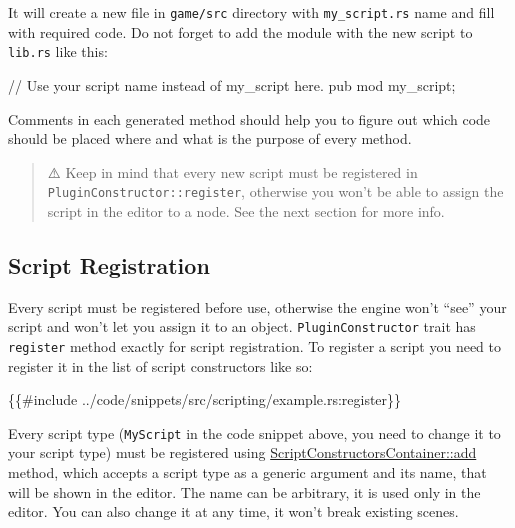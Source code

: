 \documentclass[
]{book}
\newenvironment{Shaded}{\begin{snugshade}}{\end{snugshade}}
\newcommand{\NormalTok}[1]{#1}
\theoremstyle{definition}
\theoremstyle{definition}
\theoremstyle{definition}
\theoremstyle{definition}
\theoremstyle{remark}
\begin{document}
It will create a new file in \texttt{game/src} directory with \texttt{my\_script.rs} name and fill with required code. Do not forget to add the module with the new script to \texttt{lib.rs} like this:

\begin{Shaded}
\begin{Highlighting}[]
\NormalTok{// Use your script name instead of \textasciigrave{}my\_script\textasciigrave{} here.}
\NormalTok{pub mod my\_script;}
\end{Highlighting}
\end{Shaded}

Comments in each generated method should help you to figure out which code should be placed where and what is the purpose of every method.

\begin{quote}
⚠️ Keep in mind that every new script must be registered in \texttt{PluginConstructor::register}, otherwise you won't be able to assign the script in the editor to a node. See the next section for more info.
\end{quote}

\subsection{Script Registration}\label{script-registration}

Every script must be registered before use, otherwise the engine won't ``see'' your script and won't let you assign it to an object. \texttt{PluginConstructor} trait has \texttt{register} method exactly for script registration. To register a script you need to register it in the list of script constructors like so:

\begin{Shaded}
\begin{Highlighting}[]
\NormalTok{\{\{\#include ../code/snippets/src/scripting/example.rs:register\}\}}
\end{Highlighting}
\end{Shaded}

Every script type (\texttt{MyScript} in the code snippet above, you need to change it to your script type) must be registered using \href{https://docs.rs/fyrox/latest/fyrox/script/constructor/struct.ScriptConstructorContainer.html\#method.add}{ScriptConstructorsContainer::add} method, which accepts a script type as a generic argument and its name, that will be shown in the editor. The name can be arbitrary, it is used only in the editor. You can also change it at any time, it won't break existing scenes.
\end{document}
